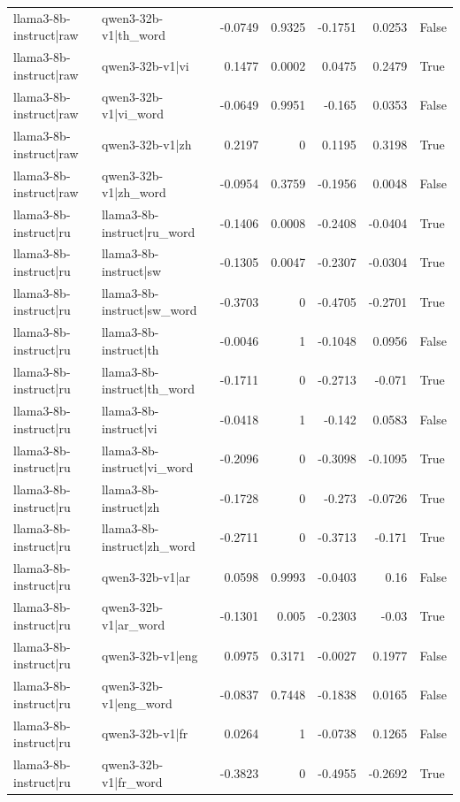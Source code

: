 \begin{table}
\begin{tabular}{l l r r r r l}
llama3-8b-instruct|raw & qwen3-32b-v1|th_word & -0.0749 & 0.9325 & -0.1751 & 0.0253 & False \\
llama3-8b-instruct|raw & qwen3-32b-v1|vi & 0.1477 & 0.0002 & 0.0475 & 0.2479 & True \\
llama3-8b-instruct|raw & qwen3-32b-v1|vi_word & -0.0649 & 0.9951 & -0.165 & 0.0353 & False \\
llama3-8b-instruct|raw & qwen3-32b-v1|zh & 0.2197 & 0 & 0.1195 & 0.3198 & True \\
llama3-8b-instruct|raw & qwen3-32b-v1|zh_word & -0.0954 & 0.3759 & -0.1956 & 0.0048 & False \\
llama3-8b-instruct|ru & llama3-8b-instruct|ru_word & -0.1406 & 0.0008 & -0.2408 & -0.0404 & True \\
llama3-8b-instruct|ru & llama3-8b-instruct|sw & -0.1305 & 0.0047 & -0.2307 & -0.0304 & True \\
llama3-8b-instruct|ru & llama3-8b-instruct|sw_word & -0.3703 & 0 & -0.4705 & -0.2701 & True \\
llama3-8b-instruct|ru & llama3-8b-instruct|th & -0.0046 & 1 & -0.1048 & 0.0956 & False \\
llama3-8b-instruct|ru & llama3-8b-instruct|th_word & -0.1711 & 0 & -0.2713 & -0.071 & True \\
llama3-8b-instruct|ru & llama3-8b-instruct|vi & -0.0418 & 1 & -0.142 & 0.0583 & False \\
llama3-8b-instruct|ru & llama3-8b-instruct|vi_word & -0.2096 & 0 & -0.3098 & -0.1095 & True \\
llama3-8b-instruct|ru & llama3-8b-instruct|zh & -0.1728 & 0 & -0.273 & -0.0726 & True \\
llama3-8b-instruct|ru & llama3-8b-instruct|zh_word & -0.2711 & 0 & -0.3713 & -0.171 & True \\
llama3-8b-instruct|ru & qwen3-32b-v1|ar & 0.0598 & 0.9993 & -0.0403 & 0.16 & False \\
llama3-8b-instruct|ru & qwen3-32b-v1|ar_word & -0.1301 & 0.005 & -0.2303 & -0.03 & True \\
llama3-8b-instruct|ru & qwen3-32b-v1|eng & 0.0975 & 0.3171 & -0.0027 & 0.1977 & False \\
llama3-8b-instruct|ru & qwen3-32b-v1|eng_word & -0.0837 & 0.7448 & -0.1838 & 0.0165 & False \\
llama3-8b-instruct|ru & qwen3-32b-v1|fr & 0.0264 & 1 & -0.0738 & 0.1265 & False \\
llama3-8b-instruct|ru & qwen3-32b-v1|fr_word & -0.3823 & 0 & -0.4955 & -0.2692 & True \\

\end{tabular}
\end{table}
